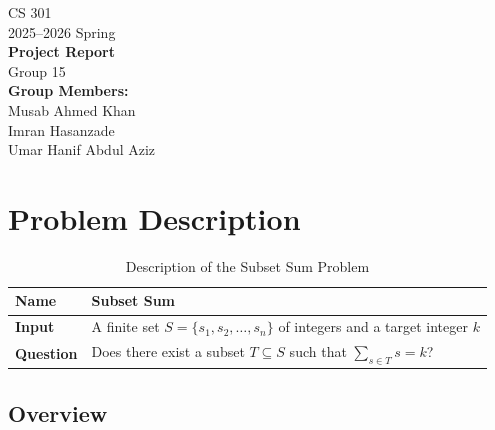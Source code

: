 \documentclass[12pt,a4paper]{article}
\theoremstyle{definition}
\begin{document}
\begin{titlepage}
  \centering
  \vspace*{2cm}
  {\Large CS 301}\\[0.4cm]
  {\large 2025--2026 Spring}\\[1.5cm]
  {\Huge \textbf{Project Report}}\\[1.5cm]
  {\large Group 15}\\[0.8cm]
  {\normalsize
    \textbf{Group Members:}\\[0.3cm]
    Musab Ahmed Khan \\
    Imran Hasanzade \\
    Umar Hanif Abdul Aziz 
  }
  \vfill
\end{titlepage}

\tableofcontents
\newpage

\section{Problem Description}

\begin{table}[h!]
  \centering
  \renewcommand{\arraystretch}{1.4}
  \begin{tabular}{>{\bfseries}p{2.5cm} p{10cm}}
    \toprule
    Name     & Subset Sum \\
    \midrule
    Input    & A finite set $S = \{s_1, s_2, \ldots, s_n\}$ of integers
               and a target integer $k$ \\
    Question & Does there exist a subset $T \subseteq S$ such that
               $\displaystyle\sum_{s \in T} s = k$? \\
    \bottomrule
  \end{tabular}
  \caption{Description of the Subset Sum Problem}
\end{table}

\subsection{Overview}
\end{document}
